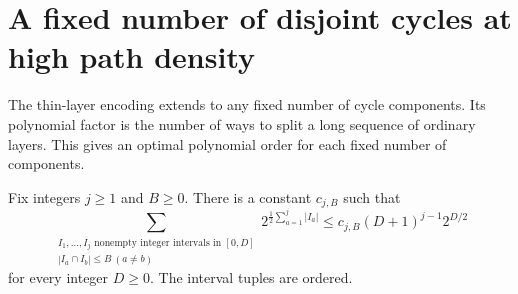 \section{A fixed number of disjoint cycles at high path density}
\label{sec:fixed-cycle-packings}

The thin-layer encoding extends to any fixed number of cycle components.
Its polynomial factor is the number of ways to split a long sequence of ordinary layers.
This gives an optimal polynomial order for each fixed number of components.

\begin{lemma}
\label{lem:fixed-interval-tuple-sum}
Fix integers $j\ge1$ and $B\ge0$.
There is a constant $c_{j,B}$ such that
\[
 \sum_{\substack{I_1,\ldots,I_j\text{ nonempty integer intervals in }[0,D]\\
 |I_a\cap I_b|\le B\ (a\ne b)}}
 2^{\frac12\sum_{a=1}^j|I_a|}
 \le c_{j,B}(D+1)^{j-1}2^{D/2}
\]
for every integer $D\ge0$.
The interval tuples are ordered.
\end{lemma}

